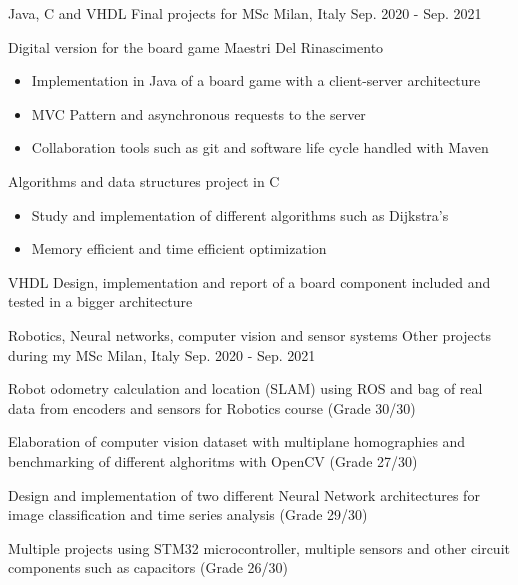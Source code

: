 \begin{cventries}
  \cventry
    {Java, C and VHDL} %
    {Final projects for MSc} %
    {Milan, Italy} %
    {Sep. 2020 - Sep. 2021} %
    {
      \begin{cvitems} %
        \item {Digital version for the board game Maestri Del Rinascimento}
            \begin{itemize}
                \item {Implementation in Java of a board game with a client-server architecture}
                \item {MVC Pattern and asynchronous requests to the server}
                \item {Collaboration tools such as git and software life cycle handled with Maven}
            \end{itemize}
        \item {Algorithms and data structures project in C}
            \begin{itemize}
                \item {Study and implementation of different algorithms such as Dijkstra's}
                \item {Memory efficient and time efficient optimization}
            \end{itemize}
        \item {VHDL Design, implementation and report of a board component included and tested in a bigger architecture}
      \end{cvitems}
    }

 \cventry
    {Robotics, Neural networks, computer vision and sensor systems} %
    {Other projects during my MSc} %
    {Milan, Italy} %
    {Sep. 2020 - Sep. 2021} %
    {
      \begin{cvitems} %
        \item {Robot odometry calculation and location (SLAM) using ROS and bag of real data from encoders and sensors for Robotics course (Grade 30/30)}
        \item {Elaboration of computer vision dataset with multiplane homographies and benchmarking of different alghoritms with OpenCV (Grade 27/30)}
        \item {Design and implementation of two different Neural Network architectures for image classification and time series analysis (Grade 29/30)}
        \item {Multiple projects using STM32 microcontroller, multiple sensors and other circuit components such as capacitors (Grade 26/30)}
      \end{cvitems}
    }

\end{cventries}
